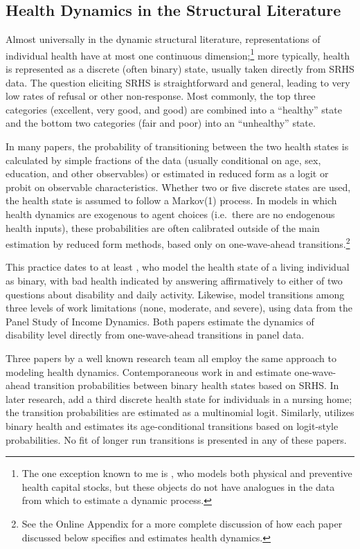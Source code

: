 \documentclass[12pt,pdftex,letterpaper]{article}
\begin{document}
\subsection{Health Dynamics in the Structural Literature}\label{sec:StructuralSRHS}

Almost universally in the dynamic structural literature, representations of individual health have at most one continuous dimension;\footnote{The one exception known to me is \cite{Ozkan17}, who models both physical and preventive health capital stocks, but these objects do not have analogues in the data from which to estimate a dynamic process.} more typically, health is represented as a discrete (often binary) state, usually taken directly from SRHS data. The question eliciting SRHS is straightforward and general, leading to very low rates of refusal or other non-response.  Most commonly, the top three categories (excellent, very good, and good) are combined into a ``healthy'' state and the bottom two categories (fair and poor) into an ``unhealthy'' state.

In many papers, the probability of transitioning between the two health states is calculated by simple fractions of the data (usually conditional on age, sex, education, and other observables) or estimated in reduced form as a logit or probit on observable characteristics. Whether two or five discrete states are used, the health state is assumed to follow a Markov(1) process. In models in which health dynamics are exogenous to agent choices (i.e.\ there are no endogenous health inputs), these probabilities are often calibrated outside of the main estimation by reduced form methods, based only on one-wave-ahead transitions.\footnote{See the Online Appendix for a more complete discussion of how each paper discussed below specifies and estimates health dynamics.}

This practice dates to at least \cite{RustPhelan97}, who model the health state of a living individual as binary, with bad health indicated by answering affirmatively to either of two questions about disability and daily activity. Likewise, \cite{LowPistaferri15} model transitions among three levels of work limitations (none, moderate, and severe), using data from the Panel Study of Income Dynamics. Both papers estimate the dynamics of disability level directly from one-wave-ahead transitions in panel data.

Three papers by a well known research team all employ the same approach to modeling health dynamics. Contemporaneous work in \cite{French11} and \cite{DeNardi10} estimate one-wave-ahead transition probabilities between binary health states based on SRHS.  In later research, \cite{DeNardi16} add a third discrete health state for individuals in a nursing home; the transition probabilities are estimated as a multinomial logit. Similarly, \cite{BlauGilleskie06} utilizes binary health and estimates its age-conditional transitions based on logit-style probabilities. No fit of longer run transitions is presented in any of these papers. 
\end{document}
